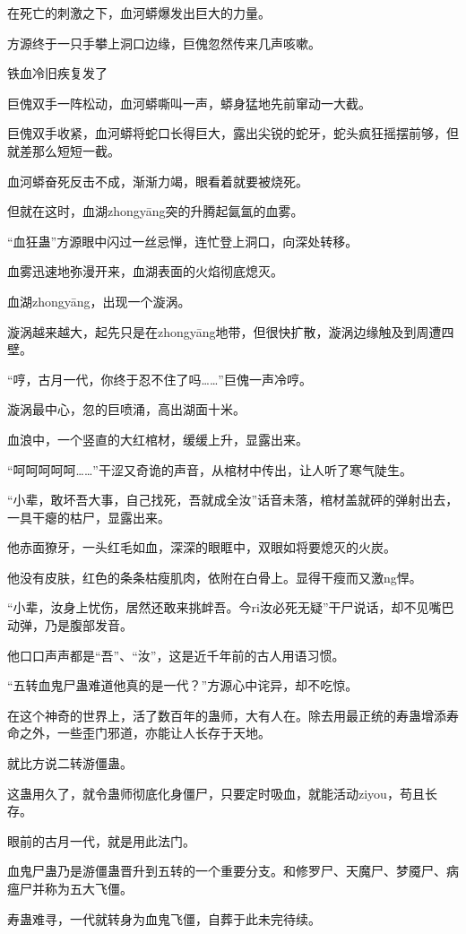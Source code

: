 \begin{this_body}
在死亡的刺激之下，血河蟒爆发出巨大的力量。

方源终于一只手攀上洞口边缘，巨傀忽然传来几声咳嗽。

铁血冷旧疾复发了

巨傀双手一阵松动，血河蟒嘶叫一声，蟒身猛地先前窜动一大截。

巨傀双手收紧，血河蟒将蛇口长得巨大，露出尖锐的蛇牙，蛇头疯狂摇摆前够，但就差那么短短一截。

血河蟒奋死反击不成，渐渐力竭，眼看着就要被烧死。

但就在这时，血湖zhongyāng突的升腾起氤氲的血雾。

“血狂蛊”方源眼中闪过一丝忌惮，连忙登上洞口，向深处转移。

血雾迅速地弥漫开来，血湖表面的火焰彻底熄灭。

血湖zhongyāng，出现一个漩涡。

漩涡越来越大，起先只是在zhongyāng地带，但很快扩散，漩涡边缘触及到周遭四壁。

“哼，古月一代，你终于忍不住了吗……”巨傀一声冷哼。

漩涡最中心，忽的巨喷涌，高出湖面十米。

血浪中，一个竖直的大红棺材，缓缓上升，显露出来。

“呵呵呵呵呵……”干涩又奇诡的声音，从棺材中传出，让人听了寒气陡生。

“小辈，敢坏吾大事，自己找死，吾就成全汝”话音未落，棺材盖就砰的弹射出去，一具干瘪的枯尸，显露出来。

他赤面獠牙，一头红毛如血，深深的眼眶中，双眼如将要熄灭的火炭。

他没有皮肤，红色的条条枯瘦肌肉，依附在白骨上。显得干瘦而又激ng悍。

“小辈，汝身上忧伤，居然还敢来挑衅吾。今ri汝必死无疑”干尸说话，却不见嘴巴动弹，乃是腹部发音。

他口口声声都是“吾”、“汝”，这是近千年前的古人用语习惯。

“五转血鬼尸蛊难道他真的是一代？”方源心中诧异，却不吃惊。

在这个神奇的世界上，活了数百年的蛊师，大有人在。除去用最正统的寿蛊增添寿命之外，一些歪门邪道，亦能让人长存于天地。

就比方说二转游僵蛊。

这蛊用久了，就令蛊师彻底化身僵尸，只要定时吸血，就能活动ziyou，苟且长存。

眼前的古月一代，就是用此法门。

血鬼尸蛊乃是游僵蛊晋升到五转的一个重要分支。和修罗尸、天魔尸、梦魇尸、病瘟尸并称为五大飞僵。

寿蛊难寻，一代就转身为血鬼飞僵，自葬于此未完待续。

\end{this_body}

